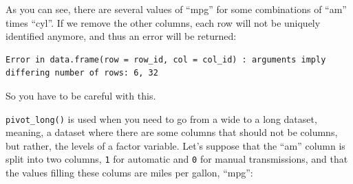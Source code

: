 \documentclass[]{gitbook}
\newenvironment{Shaded}{\begin{snugshade}}{\end{snugshade}}
\newcommand{\DataTypeTok}[1]{\textcolor[rgb]{0.13,0.29,0.53}{#1}}
\newcommand{\KeywordTok}[1]{\textcolor[rgb]{0.13,0.29,0.53}{\textbf{#1}}}
\newcommand{\NormalTok}[1]{#1}
\newcommand{\OperatorTok}[1]{\textcolor[rgb]{0.81,0.36,0.00}{\textbf{#1}}}
\newcommand{\StringTok}[1]{\textcolor[rgb]{0.31,0.60,0.02}{#1}}
\begin{document}
As you can see, there are several values of ``mpg'' for some combinations of ``am'' times ``cyl''. If
we remove the other columns, each row will not be uniquely identified anymore, and thus an error will be
returned:

\begin{Shaded}
\end{Shaded}

\begin{verbatim}
Error in data.frame(row = row_id, col = col_id) : arguments imply differing number of rows: 6, 32
\end{verbatim}

So you have to be careful with this.

\texttt{pivot\_long()} is used when you need to go from a wide to a long dataset, meaning, a dataset where
there are some columns that should not be columns, but rather, the levels of a factor variable.
Let's suppose that the ``am'' column is split into two columns, \texttt{1} for
automatic and \texttt{0} for manual transmissions, and that the values filling these colums are miles per
gallon, ``mpg'':

\begin{Shaded}
\end{Shaded}
\end{document}
